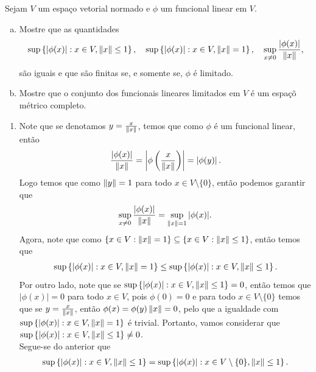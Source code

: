\begin{homeworkProblem}[4]
  Sejam $V$ um espaço vetorial normado e $\phi$ um funcional linear em $V$.
  \begin{enumerate}[a)]
    \item Mostre que as quantidades
      \begin{align*}
        \sup\left\{ |\phi(x)|:x\in V,\left\|x\right\|\leq 1 \right\},\quad\sup\left\{ |\phi(x)|:x\in V,\left\|x\right\|=1 \right\},\quad\sup_{x\neq 0}\frac{|\phi(x)|}{\left\|x\right\|},
      \end{align*}
      são iguais e que são finitas se, e somente se, $\phi$ é limitado.
    \item Mostre que o conjunto dos funcionais lineares limitados em $V$ é um espaçõ métrico completo. 
  \end{enumerate}
  \begin{solution}
  \begin{enumerate}
    \item Note que se denotamos $y=\frac{x}{\left\|x\right\|}$, temos que como $\phi$ é um funcional linear, então 
      \begin{align*}
        \frac{|\phi(x)|}{\left\|x\right\|}=\left| \phi\left( \frac{x}{\left\|x\right\|} \right) \right|=\left| \phi(y) \right|.
      \end{align*}
      Logo temos que como $\left\|y\right\|=1$ para todo $x\in V\setminus\{0\}$, então podemos garantir que
      \begin{align*}
        \sup_{x\neq 0}\frac{|\phi(x)|}{\left\|x\right\|}=\sup_{\left\|x\right\|=1}|\phi(x)|.
      \end{align*}
      Agora, note que como $\{x\in V:\left\|x\right\|=1\}\subseteq\left\{ x\in V:\left\|x\right\|\leq 1 \right\}$, então temos que
      \begin{align*}
        \sup\left\{ |\phi(x)|:x\in V,\left\|x\right\|= 1 \right\}\leq        \sup\left\{ |\phi(x)|:x\in V,\left\|x\right\|\leq 1 \right\}.
      \end{align*}
      Por outro lado, note que se $\sup\left\{ |\phi(x)|:x\in V,\left\|x\right\|\leq 1 \right\}=0$, então temos que $|\phi(x)|=0$ para todo $x\in V$, pois $\phi(0)=0$ e para todo $x\in V\setminus\{0\}$ temos que se $y=\frac{x}{\left\|x\right\|}$, então $\phi(x)=\phi(y)\left\|x\right\|=0$, pelo que a igualdade com $\sup\left\{ |\phi(x)|:x\in V,\left\|x\right\|=1 \right\}$ é trivial. Portanto, vamos considerar que $\sup\left\{ |\phi(x)|:x\in V,\left\|x\right\|\leq 1 \right\}\neq 0$.\\
      Segue-se do anterior que
      \begin{align*}
        \sup\left\{ |\phi(x)|:x\in V,\norm{x}\leq 1 \right\}=        \sup\left\{ |\phi(x)|:x\in V\setminus\{0\},\norm{x}\leq 1 \right\}.

\end{align*}
\end{enumerate}
\end{solution}
\end{homeworkProblem}
